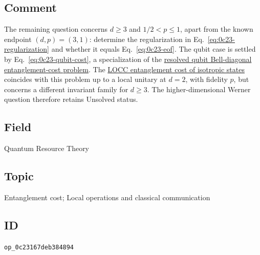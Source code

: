 \subsection*{Comment}

The remaining question concerns $d\geq3$ and $1/2<p\leq1$, apart
from the known endpoint $(d,p)=(3,1)$: determine the regularization in
Eq.~\eqref{eq:0c23-regularization} and whether it equals Eq.~\eqref{eq:0c23-eof}.
The qubit case is settled by Eq.~\eqref{eq:0c23-qubit-cost}, a specialization
of the \href{https://qiqc-op.com/problem/op_aa21ac5ebca8b888/}{resolved qubit Bell-diagonal entanglement-cost problem}.
The \href{https://qiqc-op.com/problem/op_27b7826ed57e893a/}{LOCC entanglement cost of isotropic states}
coincides with this problem up to a local unitary at $d=2$, with fidelity
$p$, but concerns a different invariant family for $d\geq3$.
The higher-dimensional Werner question therefore retains Unsolved status.

\subsection*{Field}

Quantum Resource Theory

\subsection*{Topic}

Entanglement cost; Local operations and classical communication

\subsection*{ID}

\texttt{op\_0c23167deb384894}

